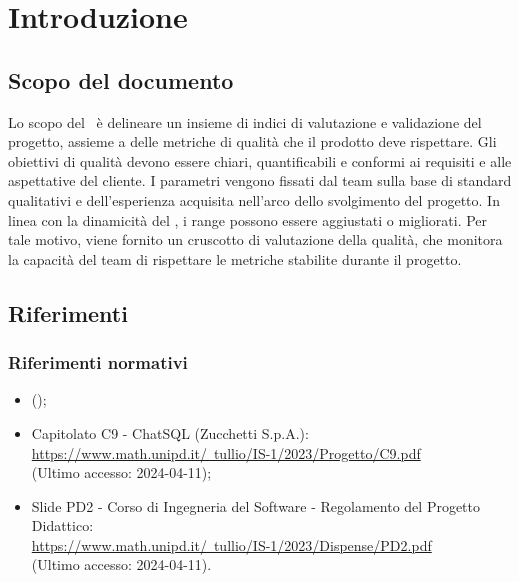 \section{Introduzione}

\subsection{Scopo del documento}
\par Lo scopo del \PdQ\ è delineare un insieme di indici di valutazione e validazione del progetto, assieme a delle metriche di qualità che il prodotto deve rispettare. Gli obiettivi di qualità devono essere chiari, quantificabili e conformi ai requisiti e alle aspettative del cliente. I parametri vengono fissati dal team sulla base di standard qualitativi e dell'esperienza acquisita nell'arco dello svolgimento del progetto. In linea con la dinamicità del \PdQ, i range possono essere aggiustati o migliorati. Per tale motivo, viene fornito un cruscotto di valutazione della qualità, che monitora la capacità del team di rispettare le metriche stabilite durante il progetto.

\subsection{Riferimenti}

\subsubsection{Riferimenti normativi}
\begin{itemize}
  \item (\NormeDiProgetto);
  \item Capitolato C9 - ChatSQL (Zucchetti S.p.A.): \\ \href{https://www.math.unipd.it/~tullio/IS-1/2023/Progetto/C9.pdf}{https://www.math.unipd.it/~tullio/IS-1/2023/Progetto/C9.pdf} \\ (Ultimo accesso: 2024-04-11);
  \item Slide PD2 - Corso di Ingegneria del Software - Regolamento del Progetto Didattico: \\ \href{https://www.math.unipd.it/~tullio/IS-1/2023/Dispense/PD2.pdf}{https://www.math.unipd.it/~tullio/IS-1/2023/Dispense/PD2.pdf} \\ (Ultimo accesso: 2024-04-11).
\end{itemize}

